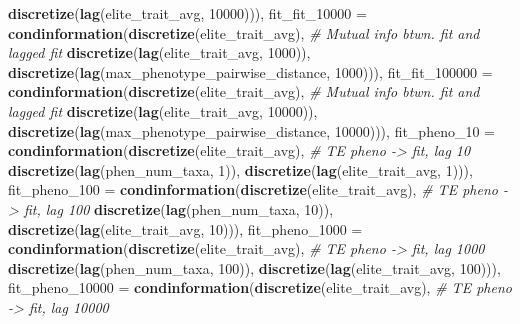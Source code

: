 \documentclass[]{book}
\newenvironment{Shaded}{\begin{snugshade}}{\end{snugshade}}
\newcommand{\CommentTok}[1]{\textcolor[rgb]{0.56,0.35,0.01}{\textit{#1}}}
\newcommand{\DataTypeTok}[1]{\textcolor[rgb]{0.13,0.29,0.53}{#1}}
\newcommand{\DecValTok}[1]{\textcolor[rgb]{0.00,0.00,0.81}{#1}}
\newcommand{\KeywordTok}[1]{\textcolor[rgb]{0.13,0.29,0.53}{\textbf{#1}}}
\newcommand{\NormalTok}[1]{#1}
\begin{document}
\begin{Shaded}
\begin{Highlighting}[]
{                                     \KeywordTok{discretize}\NormalTok{(}\KeywordTok{lag}\NormalTok{(elite_trait_avg, }\DecValTok{10000}\NormalTok{))),  }
  \DataTypeTok{fit_fit_10000 =}    \KeywordTok{condinformation}\NormalTok{(}\KeywordTok{discretize}\NormalTok{(elite_trait_avg), }\CommentTok{# Mutual info btwn. fit and lagged fit}
                                     \KeywordTok{discretize}\NormalTok{(}\KeywordTok{lag}\NormalTok{(elite_trait_avg, }\DecValTok{1000}\NormalTok{)), }
                                     \KeywordTok{discretize}\NormalTok{(}\KeywordTok{lag}\NormalTok{(max_phenotype_pairwise_distance, }\DecValTok{1000}\NormalTok{))),}
  \DataTypeTok{fit_fit_100000 =}   \KeywordTok{condinformation}\NormalTok{(}\KeywordTok{discretize}\NormalTok{(elite_trait_avg), }\CommentTok{# Mutual info btwn. fit and lagged fit}
                                     \KeywordTok{discretize}\NormalTok{(}\KeywordTok{lag}\NormalTok{(elite_trait_avg, }\DecValTok{10000}\NormalTok{)), }
                                     \KeywordTok{discretize}\NormalTok{(}\KeywordTok{lag}\NormalTok{(max_phenotype_pairwise_distance, }\DecValTok{10000}\NormalTok{))),  }
  \DataTypeTok{fit_pheno_10 =}     \KeywordTok{condinformation}\NormalTok{(}\KeywordTok{discretize}\NormalTok{(elite_trait_avg), }\CommentTok{# TE pheno -> fit, lag 10}
                                     \KeywordTok{discretize}\NormalTok{(}\KeywordTok{lag}\NormalTok{(phen_num_taxa, }\DecValTok{1}\NormalTok{)), }
                                     \KeywordTok{discretize}\NormalTok{(}\KeywordTok{lag}\NormalTok{(elite_trait_avg, }\DecValTok{1}\NormalTok{))),}
  \DataTypeTok{fit_pheno_100 =}    \KeywordTok{condinformation}\NormalTok{(}\KeywordTok{discretize}\NormalTok{(elite_trait_avg),  }\CommentTok{# TE pheno -> fit, lag 100 }
                                     \KeywordTok{discretize}\NormalTok{(}\KeywordTok{lag}\NormalTok{(phen_num_taxa, }\DecValTok{10}\NormalTok{)), }
                                     \KeywordTok{discretize}\NormalTok{(}\KeywordTok{lag}\NormalTok{(elite_trait_avg, }\DecValTok{10}\NormalTok{))),}
  \DataTypeTok{fit_pheno_1000 =}   \KeywordTok{condinformation}\NormalTok{(}\KeywordTok{discretize}\NormalTok{(elite_trait_avg),  }\CommentTok{# TE pheno -> fit, lag 1000}
                                     \KeywordTok{discretize}\NormalTok{(}\KeywordTok{lag}\NormalTok{(phen_num_taxa, }\DecValTok{100}\NormalTok{)), }
                                     \KeywordTok{discretize}\NormalTok{(}\KeywordTok{lag}\NormalTok{(elite_trait_avg, }\DecValTok{100}\NormalTok{))),}
  \DataTypeTok{fit_pheno_10000 =}  \KeywordTok{condinformation}\NormalTok{(}\KeywordTok{discretize}\NormalTok{(elite_trait_avg),  }\CommentTok{# TE pheno -> fit, lag 10000}
}
\end{Highlighting}
\end{Shaded}
\end{document}
